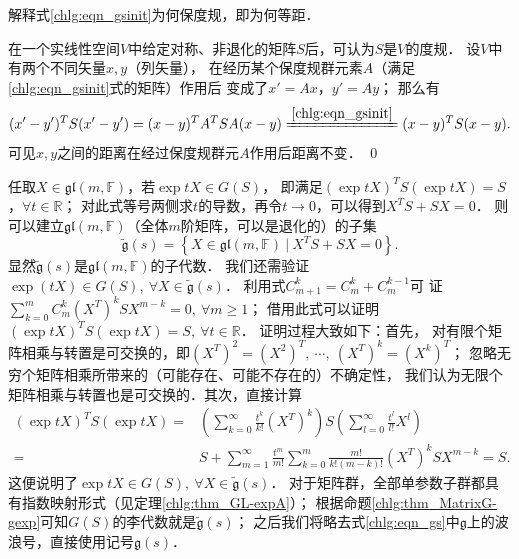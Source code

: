 \begin{example}
	解释式\eqref{chlg:eqn_gsinit}为何保度规，即为何等距．
	
	在一个实线性空间$V$中给定对称、非退化的矩阵$S$后，可认为$S$是$V$的度规．
	设$V$中有两个不同矢量$x,y$（列矢量），
	在经历某个保度规群元素$A$（满足\eqref{chlg:eqn_gsinit}式的矩阵）作用后
	变成了$x'=Ax$，$y'= Ay$；    那么有
	\begin{equation*}
		(x'-y')^T S (x'-y') = (x-y)^T A^T S A (x-y)
		\xlongequal{\ref{chlg:eqn_gsinit}}  (x-y)^T S (x-y).
	\end{equation*}
	可见$x,y$之间的距离在经过保度规群元$A$作用后{\kaishu 距离不变}． \qed
\end{example}

任取$X\in \mathfrak{gl}(m,\mathbb{F})$，若$\exp tX \in G(S)$，
即满足$(\exp tX)^T S (\exp t{X}) = S$，$ \forall t\in \mathbb{R} $；
对此式等号两侧求$t$的导数，再令$t\to 0$，可以得到$X^T S + S {X} = 0 $．
则可以建立$\mathfrak{gl}(m,\mathbb{F})$（全体$m$阶矩阵，可以是退化的）的子集
\begin{equation} \label{chlg:eqn_gs}
    \tilde{\mathfrak{g}}(s) = \left\{ X \in \mathfrak{gl}(m,\mathbb{F}) \ |\ 
       X^T S + S {X} = 0 \right\} .
\end{equation}
显然$\tilde{\mathfrak{g}}(s)$是$\mathfrak{gl}(m,\mathbb{F})$的子代数．
我们还需验证$\exp(tX)\in G(S),\ \forall X \in \tilde{\mathfrak{g}}(s)$．%
利用式$C_{m + 1}^k = C_m^k + C_m^{k - 1}$可
证$ \sum_{k=0}^{m}C^k_m (X^T)^k S {X}^{m-k} =0, \ \forall m\geqslant 1 $；
借用此式可以证明$(\exp tX)^T S (\exp t{X}) = S, \ \forall t\in \mathbb{R}$．
证明过程大致如下：首先，
对有限个矩阵相乘与转置是可交换的，即$(X^T)^2 = (X^2)^T,\ \cdots,\ (X^T)^k = (X^k)^T$；
忽略无穷个矩阵相乘所带来的（可能存在、可能不存在的）不确定性，
我们认为无限个矩阵相乘与转置也是可交换的．其次，直接计算
\begin{align*}
    (\exp tX)^T S (\exp t{X}) = & \left(\sum_{k=0}^{\infty}\frac{t^k}{k!}({X}^T)^k\right)
    S\left(\sum_{l=0}^{\infty}\frac{t^l}{l!}X^l\right) \\
    =& S + \sum_{m=1}^{\infty}\frac{t^m}{m!} \sum_{k=0}^{m}
    \frac{m!}{k!(m-k)!} (X^T)^k S {X}^{m-k} =S .
\end{align*}
这便说明了$\exp tX \in G(S),\ \forall X\in \tilde{\mathfrak{g}}(s)$．
对于矩阵群，全部单参数子群都具有指数映射形式（见定理\ref{chlg:thm_GL-expA}）；
根据命题\ref{chlg:thm_MatrixG-gexp}可知$G(S)$的李代数就是$\tilde{\mathfrak{g}}(s)$；
之后我们将略去式\eqref{chlg:eqn_gs}中$\mathfrak{g}$上的波浪号，直接使用记号$\mathfrak{g}(s)$．



